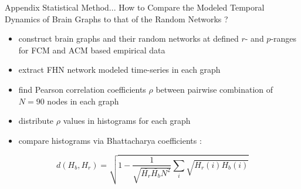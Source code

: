 \documentclass{beamer}
\begin{document}
\begin{frame}{Appendix}
Statistical Method... \break
\footnotesize{How to Compare the Modeled Temporal Dynamics of Brain Graphs to that of the Random Networks ? }

\begin{itemize}
  \item construct brain graphs and their random networks at defined $r$- and $p$-ranges for FCM and ACM based empirical data  
  \item extract FHN network modeled time-series in each graph
  \item find Pearson correlation coefficients $\rho$ between pairwise combination of $N=90$ nodes in each graph
  \item distribute $\rho$ values in histograms for each graph
  \item compare histograms via Bhattacharya coefficients :
    \end{itemize}
\begin{equation}
d(H_b, H_r) = \sqrt{1- \dfrac{1}{ \sqrt{\bar{H_r} \bar{H_b} N^2}} \sum_{i} \sqrt{H_r(i)H_b(i)} } 
\end{equation}

\end{frame}
\end{document}
